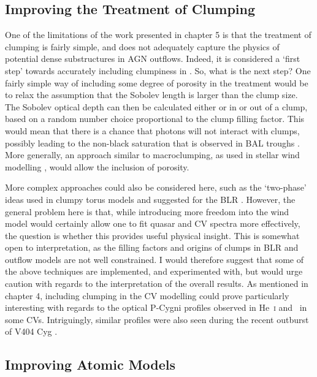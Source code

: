 \subsection{Improving the Treatment of Clumping}

One of the limitations of the work presented in chapter 5 is that the
treatment of clumping is fairly simple, and does not adequately capture the
physics of potential dense substructures in AGN outflows. 
Indeed, it is considered a `first step' towards
accurately including clumpiness in \py. So, what is the next step? One fairly 
simple way of including some degree of porosity in the treatment would 
be to relax the assumption that the Sobolev length is larger than the
clump size. The Sobolev optical depth can then be calculated either
or in or out of a clump, based on a random number choice proportional
to the clump filling factor. This would mean that there is a chance 
that photons will not interact with clumps, possibly leading to
the non-black saturation that is observed in BAL troughs 
\citep[][see also section~\ref{sec:balqso_angles}]{arav1999b,arav1999a}.
More generally, an approach similar to macroclumping, as 
used in stellar wind modelling \citep[e.g.][]{hamann2008,surlan2012},
would allow the inclusion of porosity.

More complex approaches could also be considered here, 
such as the `two-phase' ideas used in clumpy torus models 
\citep{stalevski2013} and suggested for the BLR 
\citep[e.g.][]{netzer1990, dekool1995, elvis2000}.
However, the general problem here is that, while introducing more freedom into 
the wind model would certainly allow one to fit quasar and CV spectra
more effectively, the question is whether this provides useful physical insight.
This is somewhat open to interpretation, as the filling factors and origins of clumps
in BLR and outflow models are not well constrained. I would therefore suggest that
some of the above techniques are implemented, and experimented with,
but would urge caution with regards to the interpretation of the overall
results. As mentioned in chapter 4, including clumping in the CV modelling
could prove particularly interesting with regards to the optical P-Cygni profiles 
observed in He~\textsc{i} and \ha\ in some CVs. 
Intriguingly, similar profiles were also 
seen during the recent outburst of V404 Cyg \citep{munozdarias2016}.

\subsection{Improving Atomic Models}

